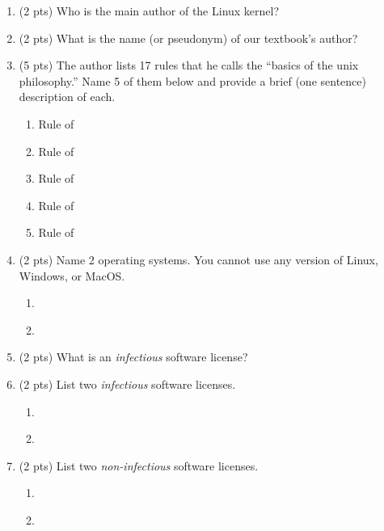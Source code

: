 \documentclass{article}
\begin{document}
\begin{enumerate}

\item
(2 pts)
Who is the main author of the Linux kernel?
\vspace{0.75in}

\item
(2 pts)
What is the name (or pseudonym) of our textbook's author?
\vspace{0.75in}

\item
(5 pts)
The author lists 17 rules that he calls the ``basics of the unix philosophy.''
Name 5 of them below and provide a brief (one sentence) description of each.
\begin{enumerate}
\item Rule of
\vspace{0.75in}
\item Rule of
\vspace{0.75in}
\item Rule of
\vspace{0.75in}
\item Rule of
\vspace{0.75in}
\item Rule of
\vspace{0.75in}
\end{enumerate}

\item
(2 pts)
Name 2 operating systems.
You cannot use any version of Linux, Windows, or MacOS.
\begin{enumerate}
\item ~
\vspace{0.5in}
\item ~
\vspace{0.5in}
\end{enumerate}

\item
(2 pts)
What is an \emph{infectious} software license?
\vspace{1in}

\item
(2 pts)
List two \emph{infectious} software licenses.
\begin{enumerate}
\item ~
\vspace{0.5in}
\item ~
\vspace{0.5in}
\end{enumerate}

\item
(2 pts)
List two \emph{non-infectious} software licenses.
\begin{enumerate}
\item ~
\vspace{0.5in}
\item ~
\vspace{0.5in}
\end{enumerate}


\end{enumerate}
\end{document}
